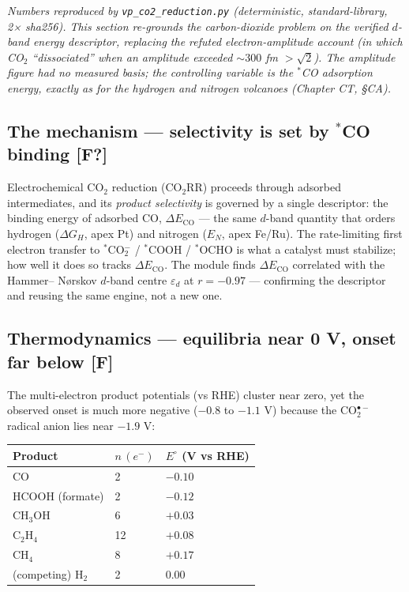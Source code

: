 \documentclass[
  10pt,
]{article}
\begin{document}
\emph{Numbers reproduced by \texttt{vp\_co2\_reduction.py}
(deterministic, standard-library, 2× sha256). This section re-grounds
the carbon-dioxide problem on the verified \(d\)-band energy descriptor,
replacing the refuted electron-amplitude account (in which CO\(_2\)
``dissociated'' when an amplitude exceeded \(\sim 300\) fm \(>\sqrt2\)).
The amplitude figure had no measured basis; the controlling variable is
the \(^*\)CO adsorption energy, exactly as for the hydrogen and nitrogen
volcanoes (Chapter CT, §CA).}

\hypertarget{the-mechanism-selectivity-is-set-by-co-binding-f}{%
\subsection{\texorpdfstring{The mechanism --- selectivity is set by
\(^*\)CO binding
\textbf{{[}F?{]}}}{The mechanism --- selectivity is set by \^{}*CO binding {[}F?{]}}}\label{the-mechanism-selectivity-is-set-by-co-binding-f}}

Electrochemical CO\(_2\) reduction (CO\(_2\)RR) proceeds through
adsorbed intermediates, and its \emph{product selectivity} is governed
by a single descriptor: the binding energy of adsorbed CO,
\(\Delta E_{\mathrm{CO}}\) --- the same \(d\)-band quantity that orders
hydrogen (\(\Delta G_H\), apex Pt) and nitrogen (\(E_N\), apex Fe/Ru).
The rate-limiting first electron transfer to \(^*\)CO\(_2^{-}\) /
\(^*\)COOH / \(^*\)OCHO is what a catalyst must stabilize; how well it
does so tracks \(\Delta E_{\mathrm{CO}}\). The module finds
\(\Delta E_{\mathrm{CO}}\) correlated with the Hammer-- Nørskov
\(d\)-band centre \(\varepsilon_d\) at \(r = -0.97\) --- confirming the
descriptor and reusing the same engine, not a new one.

\hypertarget{thermodynamics-equilibria-near-0-v-onset-far-below-f}{%
\subsection{\texorpdfstring{Thermodynamics --- equilibria near 0 V,
onset far below
\textbf{{[}F{]}}}{Thermodynamics --- equilibria near 0 V, onset far below {[}F{]}}}\label{thermodynamics-equilibria-near-0-v-onset-far-below-f}}

The multi-electron product potentials (vs RHE) cluster near zero, yet
the observed onset is much more negative (\(-0.8\) to \(-1.1\) V)
because the CO\(_2^{\bullet-}\) radical anion lies near \(-1.9\) V:

\begin{longtable}[]{@{}lll@{}}
\toprule\noalign{}
Product & \(n\,(e^-)\) & \(E^\circ\) (V vs RHE) \\
\midrule\noalign{}
\endhead
\bottomrule\noalign{}
\endlastfoot
CO & 2 & \(-0.10\) \\
HCOOH (formate) & 2 & \(-0.12\) \\
CH\(_3\)OH & 6 & \(+0.03\) \\
C\(_2\)H\(_4\) & 12 & \(+0.08\) \\
CH\(_4\) & 8 & \(+0.17\) \\
(competing) H\(_2\) & 2 & \(0.00\) \\
\end{longtable}
\end{document}

